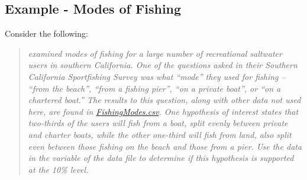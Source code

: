 \documentclass[10pt,openany]{book}\usepackage[]{graphicx}\usepackage[]{color}
\begin{document}
\subsection{Example - Modes of Fishing}
Consider the following:
\begin{quote}
\textsl{\cite{HerrigesKing1999} examined modes of fishing for a large number of recreational saltwater users in southern California. One of the questions asked in their Southern California Sportfishing Survey was what ``mode'' they used for fishing -- ``from the beach'', ``from a fishing pier'', ``on a private boat'', or ``on a chartered boat.''  The results to this question, along with other data not used here, are found in \href{https://raw.githubusercontent.com/droglenc/NCData/master/FishingModes.csv}{FishingModes.csv}. One hypothesis of interest states that two-thirds of the users will fish from a boat, split evenly between private and charter boats, while the other one-third will fish from land, also split even between those fishing on the beach and those from a pier. Use the data in the  variable of the data file to determine if this hypothesis is supported at the 10\% level.}
\end{quote}
\end{document}
